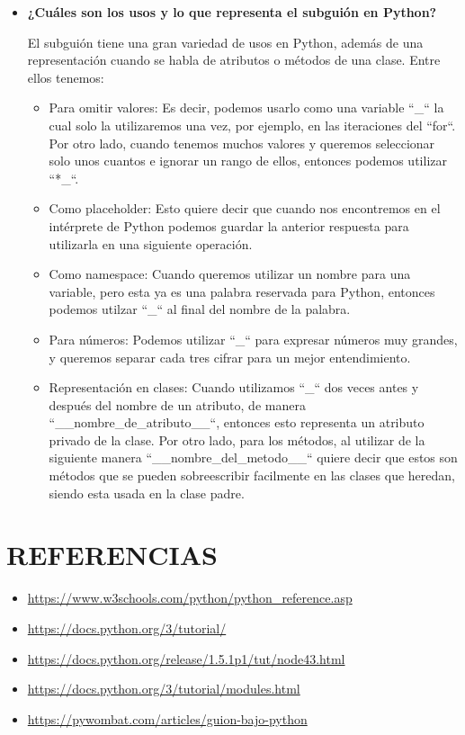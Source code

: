 \documentclass{article}
\begin{document}
\begin{itemize}
  \vspace{\baselineskip}

  \item \textbf{¿Cuáles son los usos y lo que representa el subguión en Python?}
  
  El subguión tiene una gran variedad de usos en Python, además de una representación cuando se habla de atributos o métodos de una clase. Entre ellos tenemos:

  \begin{itemize}
    \item Para omitir valores: Es decir, podemos usarlo como una variable ``\_`` la cual solo la utilizaremos una vez, por ejemplo, en las iteraciones del ``for``. Por otro lado, cuando tenemos muchos valores y queremos seleccionar solo unos cuantos e ignorar un rango de ellos, entonces podemos utilizar ``*\_``.
    \item Como placeholder: Esto quiere decir que cuando nos encontremos en el intérprete de Python podemos guardar la anterior respuesta para utilizarla en una siguiente operación.
    \item Como namespace: Cuando queremos utilizar un nombre para una variable, pero esta ya es una palabra reservada para Python, entonces podemos utilzar ``\_`` al final del nombre de la palabra.
    \item Para números: Podemos utilizar ``\_`` para expresar números muy grandes, y queremos separar cada tres cifrar para un mejor entendimiento.
    \item Representación en clases: Cuando utilizamos ``\_`` dos veces antes y después del nombre de un atributo, de manera ``\_\_nombre\_de\_atributo\_\_``, entonces esto representa un atributo privado de la clase. Por otro lado, para los métodos, al utilizar de la siguiente manera ``\_\_nombre\_del\_metodo\_\_`` quiere decir que estos son métodos que se pueden sobreescribir facilmente en las clases que heredan, siendo esta usada en la clase padre.
  \end{itemize}

\end{itemize}

\noindent
\section*{\centering REFERENCIAS}

\vspace{2\baselineskip}

\begin{itemize}
  \item \url{https://www.w3schools.com/python/python_reference.asp}
  \item \url{https://docs.python.org/3/tutorial/}
  \item \url{https://docs.python.org/release/1.5.1p1/tut/node43.html}
  \item \url{https://docs.python.org/3/tutorial/modules.html}
  \item \url{https://pywombat.com/articles/guion-bajo-python}
\end{itemize}
\end{document}
